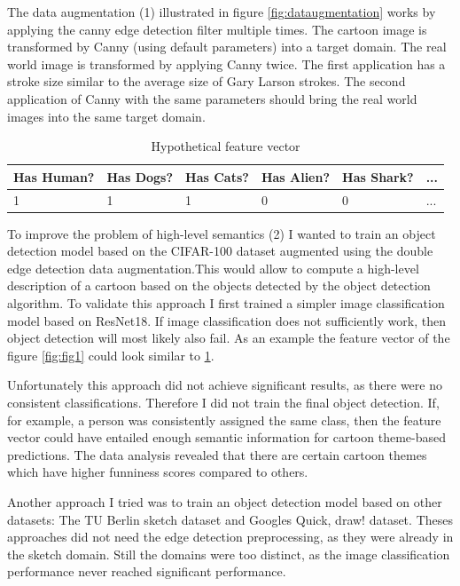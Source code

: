 \documentclass[draft,final,oneside]{vutinfth} %
\begin{document}
The data augmentation (1) illustrated in figure \ref{fig:dataugmentation} works by applying the canny edge detection filter multiple times. The cartoon image is transformed by Canny (using default parameters) into a target domain. The real world image is transformed by applying Canny twice. The first application has a stroke size similar to the average size of Gary Larson strokes. The second application of Canny with the same parameters should bring the real world images into the same target domain.

\begin{table}[]
\label{objectdetectionfeaturevector}
\centering
\begin{tabular}{|l|l|l|l|l|l|}
\hline
Has Human? & Has Dogs? & Has Cats? & Has Alien? & Has Shark? & ... \\ \hline
1   & 1 & 1 & 0 & 0 & ... \\
\hline
\end{tabular}
\caption{Hypothetical feature vector}
\end{table}

To improve the problem of high-level semantics (2) I wanted to train an object detection model based on the CIFAR-100 dataset augmented using the double edge detection data augmentation.\cite{cifar100}This would allow to compute a high-level description of a cartoon based on the objects detected by the object detection algorithm. To validate this approach I first trained a simpler image classification model based on ResNet18. If image classification does not sufficiently work, then object detection will most likely also fail. As an example the feature vector of the figure \ref{fig:fig1} could look similar to \ref{objectdetectionfeaturevector}.

Unfortunately this approach did not achieve significant results, as there were no consistent classifications. Therefore I did not train the final object detection. If, for example, a person was consistently assigned the same class, then the feature vector could have entailed enough semantic information for cartoon theme-based predictions. The data analysis revealed that there are certain cartoon themes which have higher funniness scores compared to others. 

Another approach I tried was to train an object detection model based on other datasets: The TU Berlin sketch dataset and Googles Quick, draw! dataset.\cite{tuberlin}\cite{quickdraw} Theses approaches did not need the edge detection preprocessing, as they were already in the sketch domain. Still the domains were too distinct, as the image classification performance never reached significant performance.
\end{document}
